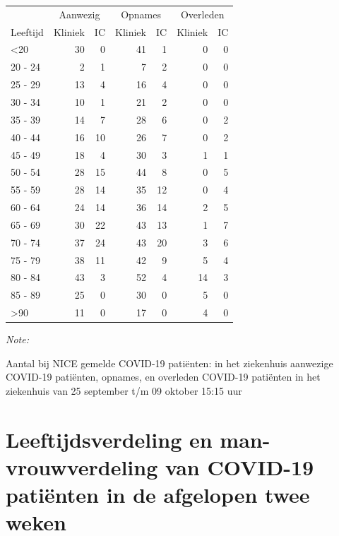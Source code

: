 \documentclass[
  english,
  man,floatsintext]{apa6}
\begin{document}
\begin{table}
\centering\begingroup\fontsize{10}{12}\selectfont

\begin{threeparttable}
\begin{tabular}{lrrrrrr}
\toprule
\multicolumn{1}{c}{ } & \multicolumn{2}{c}{Aanwezig} & \multicolumn{2}{c}{Opnames} & \multicolumn{2}{c}{Overleden} \\
\cmidrule(l{3pt}r{3pt}){2-3} \cmidrule(l{3pt}r{3pt}){4-5} \cmidrule(l{3pt}r{3pt}){6-7}
Leeftijd & Kliniek & IC & Kliniek & IC & Kliniek & IC\\
\midrule
<20 & 30 & 0 & 41 & 1 & 0 & 0\\
20 - 24 & 2 & 1 & 7 & 2 & 0 & 0\\
25 - 29 & 13 & 4 & 16 & 4 & 0 & 0\\
30 - 34 & 10 & 1 & 21 & 2 & 0 & 0\\
35 - 39 & 14 & 7 & 28 & 6 & 0 & 2\\
40 - 44 & 16 & 10 & 26 & 7 & 0 & 2\\
45 - 49 & 18 & 4 & 30 & 3 & 1 & 1\\
50 - 54 & 28 & 15 & 44 & 8 & 0 & 5\\
55 - 59 & 28 & 14 & 35 & 12 & 0 & 4\\
60 - 64 & 24 & 14 & 36 & 14 & 2 & 5\\
65 - 69 & 30 & 22 & 43 & 13 & 1 & 7\\
70 - 74 & 37 & 24 & 43 & 20 & 3 & 6\\
75 - 79 & 38 & 11 & 42 & 9 & 5 & 4\\
80 - 84 & 43 & 3 & 52 & 4 & 14 & 3\\
85 - 89 & 25 & 0 & 30 & 0 & 5 & 0\\
>90 & 11 & 0 & 17 & 0 & 4 & 0\\
\bottomrule
\end{tabular}
\begin{tablenotes}
\item \textit{Note: } 
\item Aantal bij NICE gemelde COVID-19 patiënten: in het ziekenhuis aanwezige COVID-19 patiënten, opnames, en overleden COVID-19 patiënten in het ziekenhuis van 25 september t/m 09 oktober 15:15 uur
\end{tablenotes}
\end{threeparttable}
\endgroup{}
\end{table}

\newpage

\hypertarget{leeftijdsverdeling-en-man-vrouwverdeling-van-covid-19-patiuxebnten-in-de-afgelopen-twee-weken}{%
\section{Leeftijdsverdeling en man-vrouwverdeling van COVID-19 patiënten in de afgelopen twee weken}\label{leeftijdsverdeling-en-man-vrouwverdeling-van-covid-19-patiuxebnten-in-de-afgelopen-twee-weken}}
\end{document}
